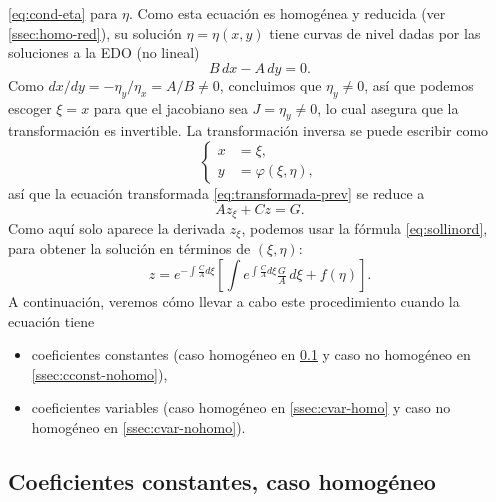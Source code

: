 \documentclass[11pt,letterpaper,draft]{report}
\theoremstyle{plain}
\theoremstyle{definition}
\theoremstyle{remark}
\newcommand\<{\langle}
\renewcommand\>{\rangle}
\renewcommand\phi\varphi
\begin{document}
\eqref{eq:cond-eta} para \(\eta\).
Como esta ecuación es homogénea y reducida
(ver \ref{ssec:homo-red}), su solución \(\eta=\eta(x,y)\) tiene curvas
de nivel dadas por las soluciones a la EDO (no lineal)
\begin{equation}
  B\,dx-A\,dy = 0.
\end{equation}
Como \(dx / dy = - \eta_y / \eta_x = A / B \neq 0\), concluimos que
\(\eta_y \neq 0\), así que podemos escoger \(\xi=x\) para que el
jacobiano sea \(J=\eta_y\neq 0\), lo cual asegura que la
transformación es invertible.
La transformación inversa se puede escribir como
\begin{equation}
  \left\{
    \begin{aligned}
      x &= \xi,
      \\
      y &= \phi(\xi,\eta),
    \end{aligned}
  \right.
\end{equation}
así que la ecuación transformada
\eqref{eq:transformada-prev} se reduce a
\begin{equation}
  Az_\xi + Cz = G.
\end{equation}
Como aquí solo aparece la derivada \(z_\xi\),
podemos usar la fórmula \eqref{eq:sollinord}, para
obtener la solución en términos de \((\xi,\eta)\):
\begin{equation}
  z
  =
  e^{-\int \frac{C}{A}d\xi}
  \left[
    \int e^{\int \frac{C}{A}d\xi} \tfrac{G}{A} \,d\xi
  +
  f(\eta)
  \right]
.\end{equation}
A continuación, veremos cómo llevar a cabo este procedimiento cuando
la ecuación tiene
\begin{itemize}
  \item
    coeficientes constantes (caso homogéneo en \ref{ssec:cconst-homo}
    y caso no homogéneo en \ref{ssec:cconst-nohomo}),
  \item 
    coeficientes variables (caso homogéneo en \ref{ssec:cvar-homo} y
    caso no homogéneo en \ref{ssec:cvar-nohomo}).
\end{itemize}

\subsection{Coeficientes constantes, caso homogéneo}
\label{ssec:cconst-homo}
\end{document}
